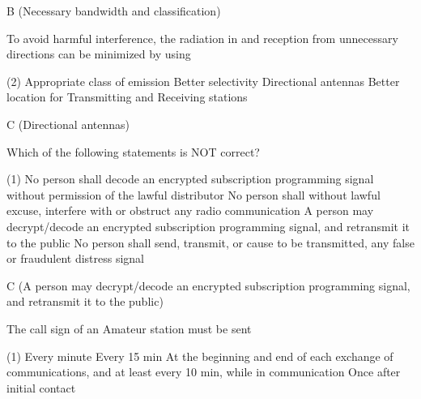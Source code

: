 \documentclass[a4paper]{article}
\begin{document}
\begin{solution}
	B (Necessary bandwidth and classification)
\end{solution}

\vspace{5mm}



\begin{question}To avoid harmful interference, the radiation in and reception from unnecessary directions can be minimized by using
	\begin{tasks}(2)
		\task Appropriate class of emission
		\task Better selectivity
		\task Directional antennas
		\task Better location for Transmitting and Receiving stations
	\end{tasks}
\end{question}

\begin{solution}
	C (Directional antennas)
\end{solution}

\vspace{5mm}



\begin{question}Which of the following statements is NOT correct?
	\begin{tasks}(1)
		\task No person shall decode an encrypted subscription programming signal without permission of the lawful distributor
		\task No person shall without lawful excuse, interfere with or obstruct any radio communication
		\task A person may decrypt/decode an encrypted subscription programming signal, and retransmit it to the public
		\task No person shall send, transmit, or cause to be transmitted, any false or fraudulent distress signal
	\end{tasks}
\end{question}

\begin{solution}
	C (A person may decrypt/decode an encrypted subscription programming signal, and retransmit it to the public)
\end{solution}

\vspace{5mm}



\begin{question}The call sign of an Amateur station must be sent
	\begin{tasks}(1)
		\task Every minute
		\task Every 15 min
		\task At the beginning and end of each exchange of communications, and at least every 10 min, while in communication
		\task Once after initial contact
	\end{tasks}
\end{question}
\end{document}
